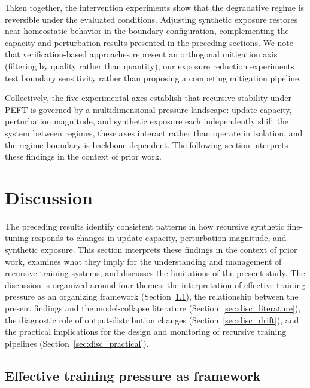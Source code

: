 \documentclass[a4paper,fleqn]{cas-dc}
\begin{document}
Taken together, the intervention experiments show that the degradative regime is
reversible under the evaluated conditions. Adjusting synthetic exposure restores
near-homeostatic behavior in the boundary configuration, complementing the
capacity and perturbation results presented in the preceding sections. We note
that verification-based approaches \citep{yi2025} represent an orthogonal
mitigation axis (filtering by quality rather than quantity); our exposure
reduction experiments test boundary sensitivity rather than proposing a
competing mitigation pipeline.

Collectively, the five experimental axes establish that recursive stability
under PEFT is governed by a multidimensional pressure landscape: update
capacity, perturbation magnitude, and synthetic exposure each independently
shift the system between regimes, these axes interact rather than operate in
isolation, and the regime boundary is backbone-dependent. The following section
interprets these findings in the context of prior work.

\section{Discussion}\label{sec:discussion}

The preceding results identify consistent patterns in how recursive synthetic
fine-tuning responds to changes in update capacity, perturbation magnitude, and
synthetic exposure. This section interprets these findings in the context of
prior work, examines what they imply for the understanding and management of
recursive training systems, and discusses the limitations of the present study.
The discussion is organized around four themes: the interpretation of effective
training pressure as an organizing framework
(Section~\ref{sec:disc_pressure}), the relationship between the present findings
and the model-collapse literature (Section~\ref{sec:disc_literature}), the
diagnostic role of output-distribution changes (Section~\ref{sec:disc_drift}),
and the practical implications for the design and monitoring of recursive
training pipelines (Section~\ref{sec:disc_practical}).

\subsection{Effective training pressure as framework}\label{sec:disc_pressure}
\end{document}
